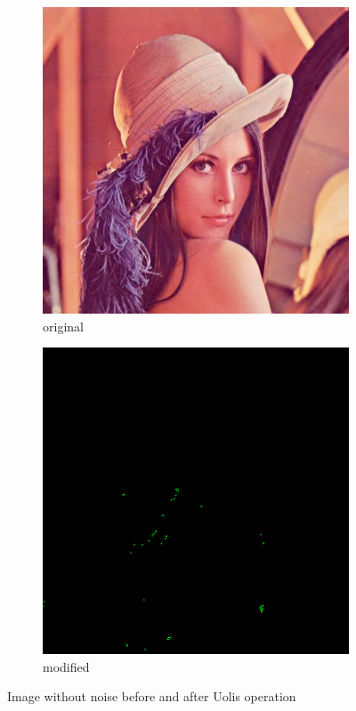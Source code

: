 \documentclass[12pt]{article}
\begin{document}
\begin{figure}[H]\centering
    \begin{subfigure}[t]{\subfiguresize}\centering
        \includegraphics[width=\textwidth]{lenac.png}
        \caption{original}
    \end{subfigure}
    \hspace{.05\textwidth}
    \begin{subfigure}[t]{\subfiguresize}\centering
        \includegraphics[width=\textwidth]{lena_uolis_clear.png}
        \caption{modified}
    \end{subfigure}
    \caption{Image without noise before and after Uolis operation}
\end{figure}
\end{document}

